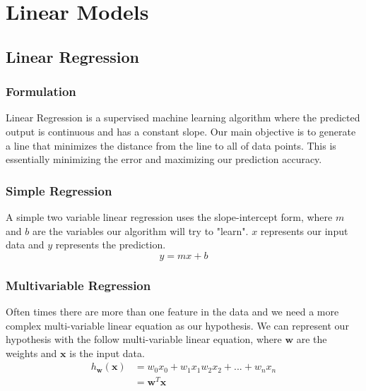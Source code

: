 \documentclass[12pt]{article}
\begin{document}
        
\section{Linear Models}
    \subsection{Linear Regression}
    \subsubsection{Formulation}
        Linear Regression is a supervised machine learning algorithm where the predicted output is continuous and has a constant slope. Our main objective is to generate a line that
        minimizes the distance from the line to all of data points. This is essentially minimizing the error and maximizing our prediction accuracy.
    
    \subsubsection{Simple Regression}
        A simple two variable linear regression uses the slope-intercept form, where $m$ and $b$ are the variables our algorithm will try to "learn". $x$ represents our input data
        and $y$ represents the prediction.
        $$ y = mx + b$$

    \subsubsection{Multivariable Regression}
        Often times there are more than one feature in the data and we need a more complex multi-variable linear equation as our hypothesis. We can represent our hypothesis with the
        follow multi-variable linear equation, where $\boldsymbol{w}$ are the weights and $\boldsymbol{x}$ is the input data.
        \begin{align*}
            h_{\boldsymbol{w}}(\boldsymbol{x}) &= w_0x_0 + w_1x_1 w_2x_2 + ... + w_nx_n \\
            &= \boldsymbol{w}^T\boldsymbol{x}
        \end{align*}
\end{document}
